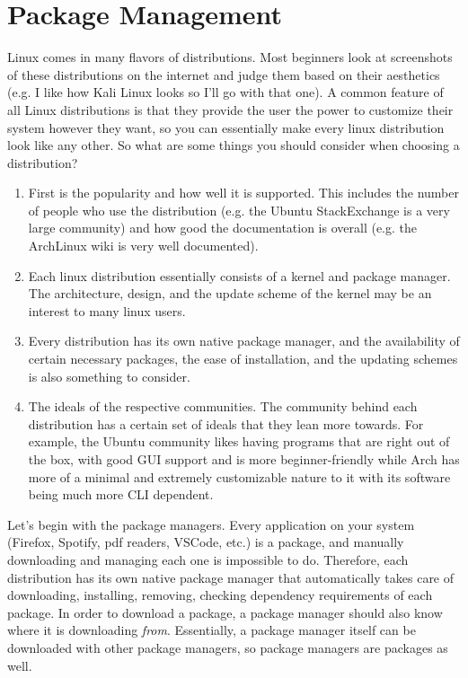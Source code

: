 \documentclass{article}
\begin{document}
\section{Package Management}
  
  Linux comes in many flavors of distributions. Most beginners look at screenshots of these distributions on the internet and judge them based on their aesthetics (e.g. I like how Kali Linux looks so I'll go with that one). A common feature of all Linux distributions is that they provide the user the power to customize their system however they want, so you can essentially make every linux distribution look like any other. So what are some things you should consider when choosing a distribution? 

  \begin{enumerate}
    \item First is the popularity and how well it is supported. This includes the number of people who use the distribution (e.g. the Ubuntu StackExchange is a very large community) and how good the documentation is overall (e.g. the ArchLinux wiki is very well documented). 
    \item Each linux distribution essentially consists of a kernel and package manager. The architecture, design, and the update scheme of the kernel may be an interest to many linux users.  
    \item Every distribution has its own native package manager, and the availability of certain necessary packages, the ease of installation, and the updating schemes is also something to consider.  
    \item The ideals of the respective communities. The community behind each distribution has a certain set of ideals that they lean more towards. For example, the Ubuntu community likes having programs that are right out of the box, with good GUI support and is more beginner-friendly while Arch has more of a minimal and extremely customizable nature to it with its software being much more CLI dependent. 
  \end{enumerate}

  Let's begin with the package managers. Every application on your system (Firefox, Spotify, pdf readers, VSCode, etc.) is a package, and manually downloading and managing each one is impossible to do. Therefore, each distribution has its own native package manager that automatically takes care of downloading, installing, removing, checking dependency requirements of each package. In order to download a package, a package manager should also know where it is downloading \textit{from}. Essentially, a package manager itself can be downloaded with other package managers, so package managers are packages as well. 
  
\end{document}
